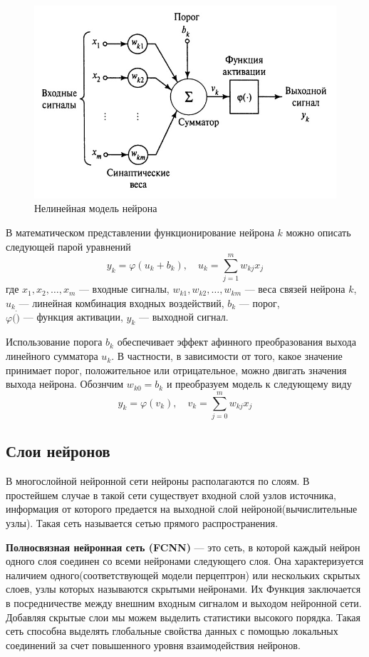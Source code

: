 \documentclass[12pt, a4paper]{article}
\renewcommand{\phi}{\varphi}
\begin{document}
	\begin{figure}[!h]
		\centering
		\includegraphics[width=0.8\linewidth]{neiron}
		\caption{Нелинейная модель нейрона}
		\label{neiron}
	\end{figure}
	\newpage
	В математическом представлении функционирование нейрона $k$ можно описать следующей парой уравнений
	\begin{equation*}
		y_k = \phi(u_k + b_k), \quad u_k = \sum_{j = 1}^{m} w_{kj}x_j 
	\end{equation*}
	где $x_1, x_2, \dots, x_m$ --- входные сигналы,
	 $w_{k1}, w_{k2}, \dots, w_{km}$ --- веса связей нейрона $k$, \\
	 $u_k $ --- линейная комбинация входных воздействий,
	 $b_k$ --- порог,\\
	 $ \phi(\dot) $ --- функция активации,
	 $ y_k $ --- выходной сигнал.
	 
	Использование порога $b_k$ обеспечивает эффект афинного преобразования выхода линейного сумматора $u_k$. В частности, в зависимости от того, какое значение принимает порог,  положительное или отрицательное, можно двигать значения выхода нейрона. Обознчим $w_{k0} = b_k$ и преобразуем модель к следующему виду
	\begin{equation*}
		y_k = \phi(v_k), \quad v_k = \sum_{j = 0}^{m} w_{kj}x_j 
	\end{equation*}
	\subsection{Слои нейронов}
	В многослойной нейронной сети нейроны располагаются по слоям. В простейшем случае в такой сети существует входной слой узлов источника, информация от которого предается на выходной слой нейроной(вычислительные узлы). Такая сеть называется сетью прямого распространения. 
	
	\textbf{Полносвязная нейронная сеть (FCNN)} — это сеть, в которой каждый нейрон одного слоя соединен со всеми нейронами следующего слоя. Она характеризуется наличием одного(соответствующей модели перцептрон) или нескольких скрытых слоев, узлы которых называются скрытыми нейронами. Их Функция заключается в посредничестве между внешним входным сигналом и выходом нейронной сети. Добавляя скрытые слои мы можем выделить статистики высокого порядка. Такая сеть способна выделять глобальные свойства данных с помощью локальных соединений за счет повышенного уровня взаимодействия нейронов.
	
\end{document}
